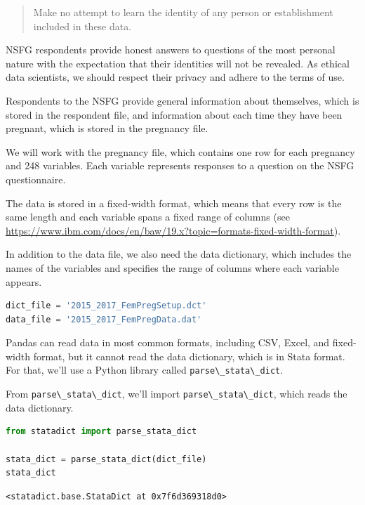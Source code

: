 \begin{quote}
Make no attempt to learn the identity of any person or establishment
included in these data.
\end{quote}

NSFG respondents provide honest answers to questions of the most
personal nature with the expectation that their identities will not be
revealed. As ethical data scientists, we should respect their privacy
and adhere to the terms of use.

Respondents to the NSFG provide general information about themselves,
which is stored in the respondent file, and information about each time
they have been pregnant, which is stored in the pregnancy file.

We will work with the pregnancy file, which contains one row for each
pregnancy and 248 variables. Each variable represents responses to a
question on the NSFG questionnaire.

The data is stored in a fixed-width format, which means that every row
is the same length and each variable spans a fixed range of columns (see
\url{https://www.ibm.com/docs/en/baw/19.x?topic=formats-fixed-width-format}).

In addition to the data file, we also need the data dictionary, which
includes the names of the variables and specifies the range of columns
where each variable appears.

\begin{lstlisting}[language=Python,style=source]
dict_file = '2015_2017_FemPregSetup.dct'
data_file = '2015_2017_FemPregData.dat'
\end{lstlisting}

Pandas can read data in most common formats, including CSV, Excel, and
fixed-width format, but it cannot read the data dictionary, which is in
Stata format. For that, we'll use a Python library called
\passthrough{\lstinline!parse\_stata\_dict!}.

From \passthrough{\lstinline!parse\_stata\_dict!}, we'll import
\passthrough{\lstinline!parse\_stata\_dict!}, which reads the data
dictionary.

\begin{lstlisting}[language=Python,style=source]
from statadict import parse_stata_dict

stata_dict = parse_stata_dict(dict_file)
stata_dict
\end{lstlisting}

\begin{lstlisting}[style=output]
<statadict.base.StataDict at 0x7f6d369318d0>
\end{lstlisting}

